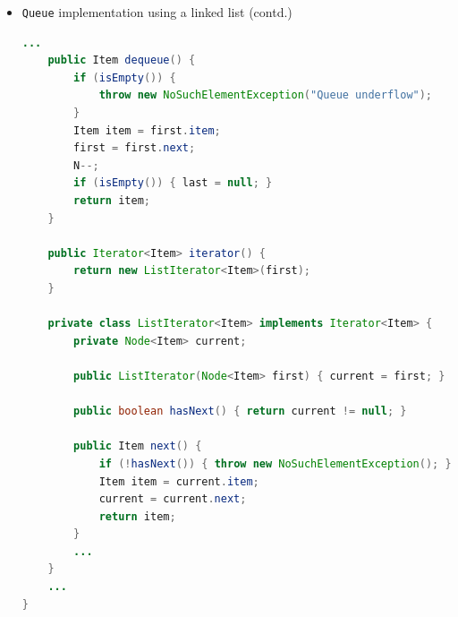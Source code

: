 \documentclass[8pt,a4paper,compress]{beamer}
\begin{document}
\begin{frame}[fragile]
\begin{itemize}
\item \lstinline{Queue} implementation using a linked list (contd.)
\begin{lstlisting}[language=Java]
    ...
    public Item dequeue() {
        if (isEmpty()) { 
            throw new NoSuchElementException("Queue underflow"); 
        }
        Item item = first.item;
        first = first.next;
        N--;
        if (isEmpty()) { last = null; }
        return item;
    }

    public Iterator<Item> iterator() { 
        return new ListIterator<Item>(first); 
    }

    private class ListIterator<Item> implements Iterator<Item> {
        private Node<Item> current;

        public ListIterator(Node<Item> first) { current = first; }

        public boolean hasNext() { return current != null; }

        public Item next() {
            if (!hasNext()) { throw new NoSuchElementException(); }
            Item item = current.item;
            current = current.next; 
            return item;
        }
        ...
    }
    ...
}
\end{lstlisting}
\end{itemize}
\end{frame}
\end{document}
